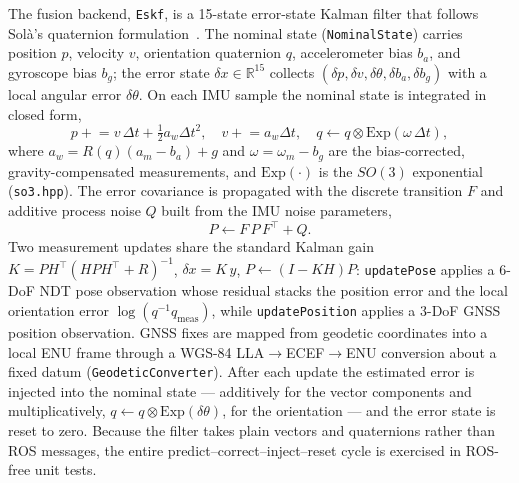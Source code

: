 The fusion backend, \texttt{Eskf}, is a 15-state error-state Kalman filter that
follows Sol\`a's quaternion formulation~\cite{sola2017quaternion}. The nominal
state (\texttt{NominalState}) carries position $p$, velocity $v$, orientation
quaternion $q$, accelerometer bias $b_a$, and gyroscope bias $b_g$; the error
state $\delta x \in \mathbb{R}^{15}$ collects
$(\delta p, \delta v, \delta\theta, \delta b_a, \delta b_g)$ with a local
angular error $\delta\theta$. On each IMU sample the nominal state is integrated
in closed form,
\begin{equation}
p \mathrel{+}= v\,\Delta t + \tfrac{1}{2} a_w \Delta t^2,\quad
v \mathrel{+}= a_w \Delta t,\quad
q \leftarrow q \otimes \mathrm{Exp}(\omega\,\Delta t),
\end{equation}
where $a_w = R(q)(a_m - b_a) + g$ and $\omega = \omega_m - b_g$ are the
bias-corrected, gravity-compensated measurements, and $\mathrm{Exp}(\cdot)$ is
the $SO(3)$ exponential (\texttt{so3.hpp}). The error covariance is propagated
with the discrete transition $F$ and additive process noise $Q$ built from the
IMU noise parameters,
\begin{equation}
P \leftarrow F\,P\,F^\top + Q .
\end{equation}
Two measurement updates share the standard Kalman gain
$K = P H^\top (H P H^\top + R)^{-1}$, $\delta x = K\,y$,
$P \leftarrow (I - KH)P$: \texttt{updatePose} applies a 6-DoF NDT pose
observation whose residual stacks the position error and the local orientation
error $\log(q^{-1} q_\mathrm{meas})$, while \texttt{updatePosition} applies a
3-DoF GNSS position observation. GNSS fixes are mapped from geodetic
coordinates into a local ENU frame through a WGS-84 LLA$\rightarrow$ECEF$\rightarrow$ENU
conversion about a fixed datum (\texttt{GeodeticConverter}). After each update
the estimated error is injected into the nominal state --- additively for the
vector components and multiplicatively, $q \leftarrow q \otimes
\mathrm{Exp}(\delta\theta)$, for the orientation --- and the error state is reset
to zero. Because the filter takes plain vectors and quaternions rather than ROS
messages, the entire predict--correct--inject--reset cycle is exercised in ROS-free unit
tests.

